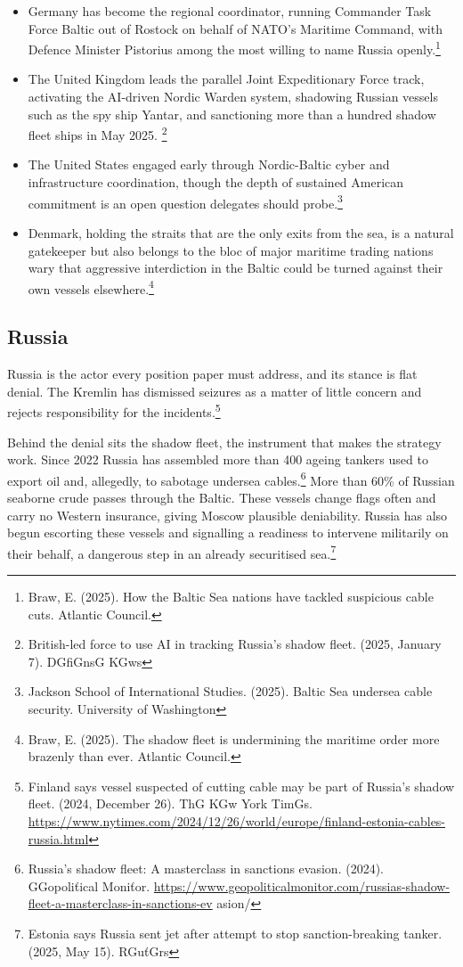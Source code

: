 \begin{itemize}
  \item Germany has become the regional coordinator, running Commander Task Force Baltic out of Rostock on behalf of NATO's Maritime Command, with Defence Minister Pistorius among the most willing to name Russia openly.\footnote{Braw, E. (2025). How the Baltic Sea nations have tackled suspicious cable cuts. Atlantic Council.}
  \item The United Kingdom leads the parallel Joint Expeditionary Force track, activating the AI-driven Nordic Warden system, shadowing Russian vessels such as the spy ship Yantar, and sanctioning more than a hundred shadow fleet ships in May 2025. \footnote{British-led force to use AI in tracking Russia's shadow fleet. (2025, January 7). DGfiGnsG KGws}
  \item The United States engaged early through Nordic-Baltic cyber and infrastructure coordination, though the depth of sustained American commitment is an open question delegates should probe.\footnote{Jackson School of International Studies. (2025). Baltic Sea undersea cable security. University of Washington}
  \item Denmark, holding the straits that are the only exits from the sea, is a natural gatekeeper but also belongs to the bloc of major maritime trading nations wary that aggressive interdiction in the Baltic could be turned against their own vessels elsewhere.\footnote{Braw, E. (2025). The shadow fleet is undermining the maritime order more brazenly than ever. Atlantic Council.}
\end{itemize}

\subsection{Russia}

Russia is the actor every position paper must address, and its stance is flat denial. The Kremlin has dismissed seizures as a matter of little concern and rejects responsibility for the incidents.\footnote{Finland says vessel suspected of cutting cable may be part of Russia's shadow fleet. (2024, December 26). ThG KGw York TimGs. \url{https://www.nytimes.com/2024/12/26/world/europe/finland-estonia-cables-russia.html}}

Behind the denial sits the shadow fleet, the instrument that makes the strategy work. Since 2022 Russia has assembled more than 400 ageing tankers used to export oil and, allegedly, to sabotage undersea cables.\footnote{Russia's shadow fleet: A masterclass in sanctions evasion. (2024). GGopoliťical Moniťor. \url{https://www.geopoliticalmonitor.com/russias-shadow-fleet-a-masterclass-in-sanctions-ev} asion/} More than 60\% of Russian seaborne crude passes through the Baltic. These vessels change flags often and carry no Western insurance, giving Moscow plausible deniability. Russia has also begun escorting these vessels and signalling a readiness to intervene militarily on their behalf, a dangerous step in an already securitised sea.\footnote{Estonia says Russia sent jet after attempt to stop sanction-breaking tanker. (2025, May 15). RGuťGrs}

